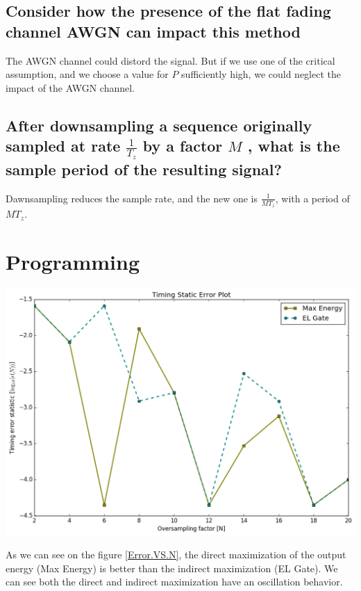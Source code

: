 \documentclass[frenchb, oneside, headings=normal]{scrartcl}
\begin{document}
\subsection{Consider how the presence of the flat fading channel AWGN can impact this method}

The AWGN channel could distord the signal. But if we use one of the critical assumption, and we choose a value for $P$ sufficiently high, we could neglect the impact of the AWGN channel.

\subsection{After downsampling a sequence originally sampled at rate $\frac{1}{T_z}$ by a factor $M$ , what is the sample period of the resulting signal?}

Dawnsampling reduces the sample rate, and the new one is $\frac{1}{MT_z}$, with a period of $MT_z$.

\section{Programming}

\begin{center}
\includegraphics[width=.9\textwidth]{img/Timing-Static-Error}
\end{center}

As we can see on the figure \ref{Error.VS.N}, the direct maximization of the output energy (Max Energy) is better than the indirect maximization (EL Gate). We can see both the direct and indirect maximization have an oscillation behavior.
\end{document}
